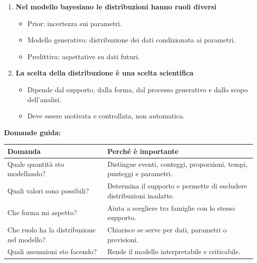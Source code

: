 \documentclass[
  italian,
  letterpaper,
  a4paper,
  11pt,
  open=any]{scrbook}
\newcounter{none} %
\providecommand{\tightlist}{%
  \setlength{\itemsep}{0pt}\setlength{\parskip}{0pt}}
\theoremstyle{plain}
\theoremstyle{definition}
\theoremstyle{definition}
\theoremstyle{remark}
\begin{document}
\begin{tcolorbox}
\begin{enumerate}
  \begin{itemize}
  \tightlist
  \item
    Posizione: dove si concentra la distribuzione.
  \item
    Scala: quanto è dispersa.
  \item
    Forma: asimmetria, code, concentrazione.
  \end{itemize}
\item
  \textbf{Nel modello bayesiano le distribuzioni hanno ruoli diversi}

  \begin{itemize}
  \tightlist
  \item
    Prior: incertezza sui parametri.
  \item
    Modello generativo: distribuzione dei dati condizionata ai
    parametri.
  \item
    Predittiva: aspettative su dati futuri.
  \end{itemize}
\item
  \textbf{La scelta della distribuzione è una scelta scientifica}

  \begin{itemize}
  \tightlist
  \item
    Dipende dal supporto, dalla forma, dal processo generativo e dallo
    scopo dell'analisi.
  \item
    Deve essere motivata e controllata, non automatica.
  \end{itemize}
\end{enumerate}

\textbf{Domande guida:}

{\def\LTcaptype{none} %
\begin{longtable}[]{@{}
  >{\raggedright\arraybackslash}p{}
  >{\raggedright\arraybackslash}p{}@{}}
\toprule\noalign{}
\begin{minipage}[b]{\linewidth}\raggedright
Domanda
\end{minipage} & \begin{minipage}[b]{\linewidth}\raggedright
Perché è importante
\end{minipage} \\
\midrule\noalign{}
\endhead
\bottomrule\noalign{}
\endlastfoot
Quale quantità sto modellando? & Distingue eventi, conteggi,
proporzioni, tempi, punteggi e parametri. \\
Quali valori sono possibili? & Determina il supporto e permette di
escludere distribuzioni inadatte. \\
Che forma mi aspetto? & Aiuta a scegliere tra famiglie con lo stesso
supporto. \\
Che ruolo ha la distribuzione nel modello? & Chiarisce se serve per
dati, parametri o previsioni. \\
Quali assunzioni sto facendo? & Rende il modello interpretabile e
criticabile. \\
\end{longtable}
}


\end{tcolorbox}
\end{document}
